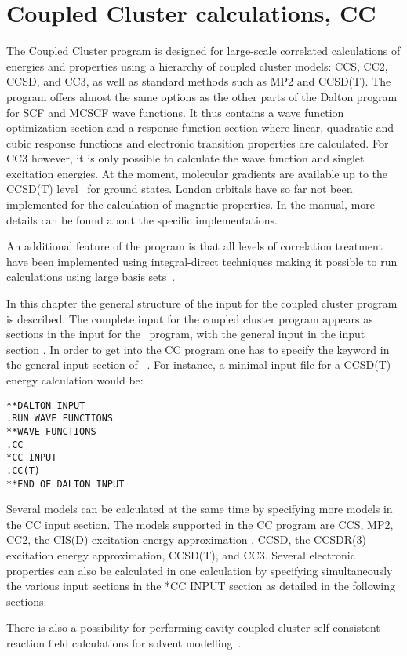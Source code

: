\chapter{Coupled Cluster calculations, CC}\label{ch:CC}

The Coupled Cluster program {\cc} is designed for large-scale
correlated calculations of energies and properties using a
hierarchy of coupled cluster models: CCS, CC2, CCSD, and CC3, as well as standard methods such as MP2 and CCSD(T).
The program offers almost the same options as the other
parts of the Dalton program for SCF and MCSCF wave functions.
It thus contains a wave function optimization section and 
a response function section
where linear, quadratic and cubic response functions and electronic
transition properties are calculated.
For CC3 however, it is only possible to calculate the wave function and 
singlet excitation energies.
At the moment, molecular gradients are available 
up to the CCSD(T) level~\cite{??} for ground states.  
London orbitals have so far not been implemented 
for the calculation of magnetic
properties.
In the manual, more details can be found about the specific implementations.

An additional feature of the program is that all levels of correlation
treatment have been implemented using integral-direct techniques making
it possible to run calculations using large basis
sets~\cite{???}.

In this chapter the general structure of the input for the
coupled cluster program is described.
The complete input for the coupled cluster program appears as
sections in the input for the \sir\ program, with the general
input in the input section . In order to get into the CC program
one has to specify the  keyword in the general input
section of \sir\ . For instance, a minimal
input file for a CCSD(T) energy calculation would be:
\begin{verbatim}
**DALTON INPUT
.RUN WAVE FUNCTIONS
**WAVE FUNCTIONS
.CC
*CC INPUT
.CC(T)
**END OF DALTON INPUT
\end{verbatim}

Several models can be calculated at the same time by specifying more models
in the CC input section. 
The models supported in the CC program are 
CCS\cite{Christiansen:CPL243},
MP2\cite{Moller34},
CC2\cite{Christiansen:CPL243},
the CIS(D) excitation energy approximation \cite{Head-Gordon:94},
CCSD\cite{Purvis82},
the CCSDR(3) excitation energy approximation\cite{Christiansen:PERTURBATIVE_TRIPLES}, 
CCSD(T)\cite{Raghavachari89}, and CC3\cite{Christiansen:JCP103,Koch:JCP106}.
Several electronic properties can also 
be calculated in one calculation by specifying simultaneously 
the various input sections in the *CC INPUT section
as detailed in the following sections.

There is also a possibility for performing cavity coupled cluster
self-consistent-reaction field calculations for solvent modelling~\cite{???}.
